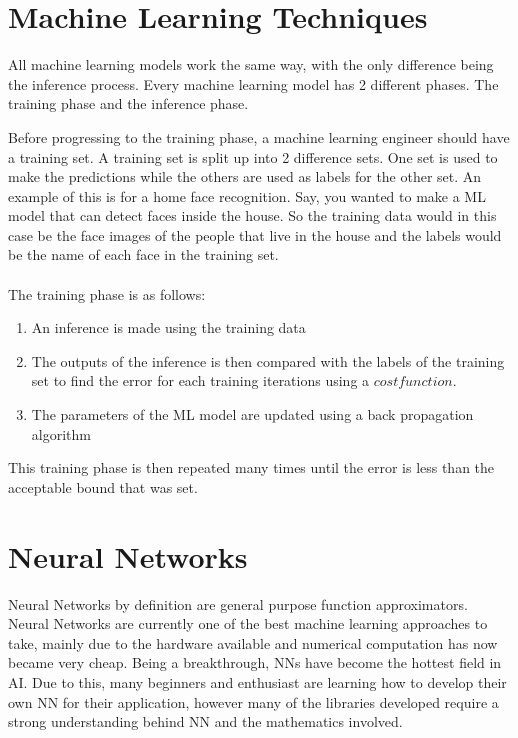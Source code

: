 \section{Machine Learning Techniques}
All machine learning models work the same way, with the only difference being the inference process. Every machine learning model has 2 different phases. The training phase and the inference phase.

Before progressing to the training phase, a machine learning engineer should have a training set. A training set is split up into 2 difference sets. One set is used to make the predictions while the others are used as labels for the other set. 
An example of this is for a home face recognition. Say, you wanted to make a ML model that can detect faces inside the house. So the training data would in this case be the face images of the people that live in the house and the labels would be the name of each face in the training set.
\\ \\
The training phase is as follows:
\begin{enumerate}
    \item An inference is made using the training data
    \item The outputs of the inference is then compared with the labels of the training set to find the error for each training iterations using a $cost function$.
    \item The parameters of the ML model are updated using a back propagation algorithm
\end{enumerate}

This training phase is then repeated many times until the error is less than the acceptable bound that was set.

\section{Neural Networks} 
Neural Networks by definition are general purpose function approximators. Neural Networks are currently one of the best machine learning approaches to take, mainly due to the hardware available and numerical computation has now became very cheap. Being a breakthrough, NNs have become the hottest field in AI. Due to this, many beginners and enthusiast are learning how to develop their own NN for their application, however many of the libraries developed require a strong understanding behind NN and the mathematics involved.